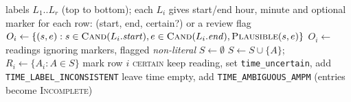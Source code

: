 \begin{algorithm}[H]
\caption{Resolve a column of time labels}\label{alg:time}
\begin{algorithmic}[1]
\Require labels $L_1..L_r$ (top to bottom); each $L_i$ gives start/end hour, minute and optional marker
\Ensure for each row: (start, end, certain?) or a review flag
  \State $O_i \gets \{(s,e) : s \in \textsc{Cand}(L_i.\mathit{start}), e \in \textsc{Cand}(L_i.\mathit{end}), \textsc{Plausible}(s,e)\}$ 
   $O_i \gets$ readings ignoring markers, flagged \textit{non-literal} \EndIf
\EndFor
\State $S \gets \emptyset$
   \Return \EndIf {}
   $S \gets S \cup \{A\}$; \Return \EndIf
     \State {}
  \EndFor
\EndProcedure
\State {}
  \State $R_i \gets \{A_i : A \in S\}$
   mark row $i$ \textsc{certain}
   keep reading, set \texttt{time\_uncertain}, add \texttt{TIME\_LABEL\_INCONSISTENT}
  \Else{} leave time empty, add \texttt{TIME\_AMBIGUOUS\_AMPM} (entries become \textsc{Incomplete})
  \EndIf
\EndFor
\end{algorithmic}
\end{algorithm}

